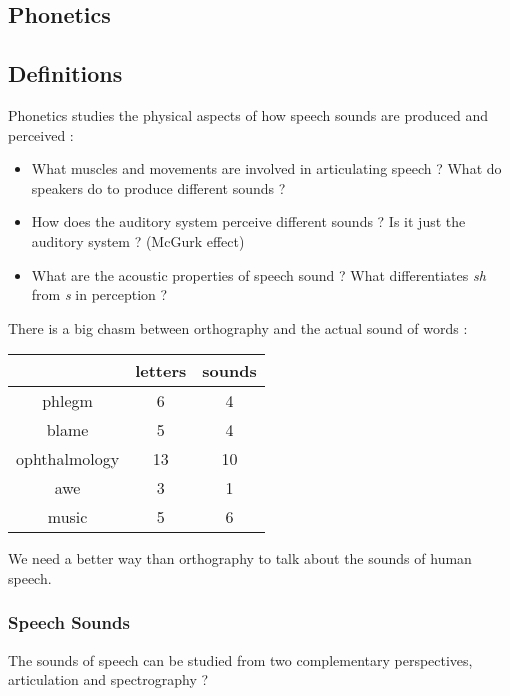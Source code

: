 \documentclass{cours}
\begin{document}
\subsection{Phonetics}
\subsection{Definitions}
Phonetics studies the physical aspects of how speech sounds are produced and perceived\! : 
\begin{itemize}
    \item What muscles and movements are involved in articulating speech ?  What do speakers do to produce different sounds ?
    \item How does the auditory system perceive different sounds ? Is it just the auditory system ? (McGurk effect)
    \item What are the acoustic properties of speech sound ? What differentiates \textsl{sh} from \textsl{s} in perception ? 
\end{itemize}

There is a big chasm between orthography and the actual sound of words\! :
\begin{center}
    \begin{tabular}{ccc}
        \toprule
        & letters & sounds\\
        \midrule
        phlegm & 6 & 4\\
        blame & 5 & 4\\
        ophthalmology & 13 & 10 \\
        awe & 3 & 1\\
        music & 5 & 6\\
        \bottomrule
    \end{tabular}
\end{center}
We need a better way than orthography to talk about the sounds of human speech.

\subsubsection{Speech Sounds}
The sounds of speech can be studied from two complementary perspectives, articulation and spectrography ? %
\end{document}
